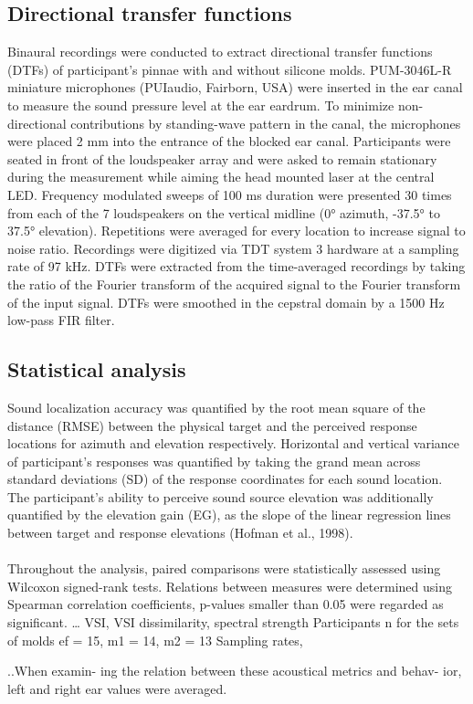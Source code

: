 \subsection{Directional transfer functions}

Binaural recordings were conducted to extract directional transfer functions (DTFs) of participant’s pinnae with and without silicone molds. PUM-3046L-R miniature microphones (PUIaudio, Fairborn, USA) were inserted in the ear canal to measure the sound pressure level at the ear eardrum. To minimize non-directional contributions by standing-wave pattern in the canal, the microphones were placed 2 mm into the entrance of the blocked ear canal. Participants were seated in front of the loudspeaker array and were asked to remain stationary during the measurement while aiming the head mounted laser at the central LED. Frequency modulated sweeps of 100 ms duration were presented 30 times from each of the 7 loudspeakers on the vertical midline (0° azimuth, -37.5° to 37.5° elevation). Repetitions were averaged for every location to increase signal to noise ratio. Recordings were digitized via TDT system 3 hardware at a sampling rate of 97 kHz. DTFs were extracted from the time-averaged recordings by taking the ratio of the Fourier transform of the acquired signal to the Fourier transform of the input signal. DTFs were smoothed in the cepstral domain by a 1500 Hz low-pass FIR filter. 

\subsection{Statistical analysis}

Sound localization accuracy was quantified by the root mean square of the distance (RMSE) between the physical target and the perceived response locations for azimuth and elevation respectively. Horizontal and vertical variance of participant’s responses was quantified by taking the grand mean across standard deviations (SD) of the response coordinates for each sound location. The participant’s ability to perceive sound source elevation was additionally quantified by the elevation gain (EG), as the slope of the linear regression lines between target and response elevations (Hofman et al., 1998).\\\\
Throughout the analysis, paired comparisons were statistically assessed using Wilcoxon signed-rank tests. Relations between measures were determined using Spearman correlation coefficients, p-values smaller than 0.05 were regarded as significant.
…
VSI, VSI dissimilarity, spectral strength 
Participants n for the sets of molds ef = 15, m1 = 14, m2 = 13
Sampling rates, 


..When examin- ing the relation between these acoustical metrics and behav- ior, left and right ear values were averaged.
